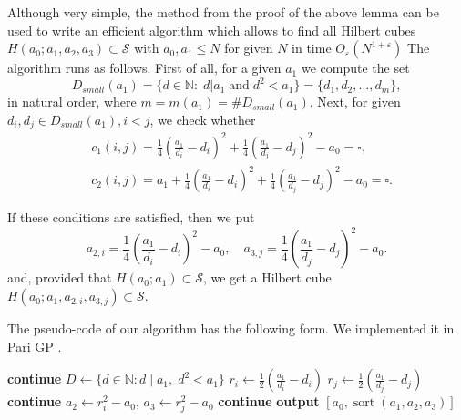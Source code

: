 \documentclass[10pt]{amsart}
\theoremstyle{plain}
\def\cal{\mathcal}
\def\bbb{\mathbb}
\def\op{\operatorname}
\newcommand{\N}{\bbb{N}}
\begin{document}
Although very simple, the method from the proof of the above lemma can be used to write an efficient algorithm which allows to find all Hilbert cubes $H(a_{0}; a_{1}, a_{2}, a_{3})\subset \cal{S}$ with $a_{0}, a_{1}\leq N$ for given $N$ in time $O_{\varepsilon}(N^{1+\varepsilon})$
The algorithm runs as follows. First of all, for a given $a_{1}$ we compute the set 
$$
D_{small}(a_{1})=\{d\in\N:\;d|a_{1}\;\mbox{and}\; d^2<a_{1}\}=\{d_{1}, d_{2}, \ldots, d_{m}\},
$$
in natural order,
where $m=m(a_{1})=\#D_{small}(a_{1})$. Next, for given $d_{i}, d_{j}\in D_{small}(a_{1}), i<j$, we check whether 
\begin{align*}
&c_{1}(i,j)=\frac{1}{4}\left(\frac{a_{1}}{d_{i}}-d_{i}\right)^2
+\frac{1}{4}\left(\frac{a_{1}}{d_{j}}-d_{j}\right)^2-a_{0}=\square,\\
&c_{2}(i,j)=a_{1}+\frac{1}{4}\left(\frac{a_{1}}{d_{i}}-d_{i}\right)^2
+\frac{1}{4}\left(\frac{a_{1}}{d_{j}}-d_{j}\right)^2-a_{0}=\square.
\end{align*}

If these conditions are satisfied, then we put 
$$
a_{2, i}=\frac{1}{4}\left(\frac{a_{1}}{d_{i}}-d_{i}\right)^2-a_{0},\quad a_{3, j}=\frac{1}{4}\left(\frac{a_{1}}{d_{j}}-d_{j}\right)^2-a_{0}.
$$
and, provided that $H(a_{0}; a_{1})\subset \cal{S}$, we get a Hilbert cube $H(a_{0}; a_{1}, a_{2,i}, a_{3, j})\subset \cal{S}$. 

The pseudo-code of our algorithm has the following form. We implemented it in Pari GP \cite{PARI2}.

\begin{algorithm}[H]
\caption{Finding Hilbert cubes $H(a_{0};a_{1},a_{2},a_{3}) \subset \mathcal{S}$ with $a_{0}<a_{1}\leq N$}
\begin{algorithmic}[1]
       \State \textbf{continue} \EndIf
      \State $D \gets \{ d \in \mathbb{N} : d \mid a_{1}, \; d^{2}<a_{1}\}$
        \State $r_i \gets \tfrac{1}{2}\left(\tfrac{a_{1}}{d_i} - d_i\right)$
        \State $r_j \gets \tfrac{1}{2}\left(\tfrac{a_{1}}{d_j} - d_j\right)$
         \State \textbf{continue} \EndIf
        \State $a_{2} \gets r_i^{2} - a_{0}$, \quad $a_{3} \gets r_j^{2} - a_{0}$
         \State \textbf{continue} \EndIf
          \State \textbf{output} $[a_{0},\op{sort}(a_{1},a_{2},a_{3})]$
        \EndIf
      \EndFor
    \EndFor
  \EndFor
\EndProcedure
\end{algorithmic}
\end{algorithm}
\end{document}

